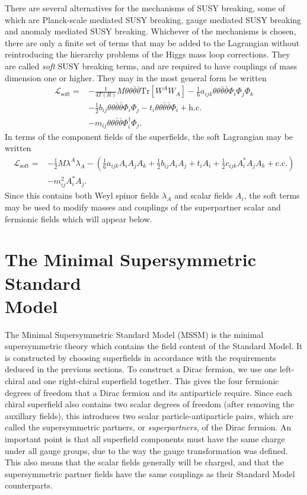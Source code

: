 \documentclass[twoside,english]{uiofysmaster}
\begin{document}
There are several alternatives for the mechanisms of SUSY breaking, some of which are Planck-scale mediated SUSY breaking, gauge mediated SUSY breaking and anomaly mediated SUSY breaking. Whichever of the mechanisms is chosen, there are only a finite set of terms that may be added to the Lagrangian without reintroducing the hierarchy problems of the Higgs mass loop corrections. They are called {\it soft} SUSY breaking terms, and are required to have couplings of mass dimension one or higher. They may in the most general form be written
\begin{align}
	\mathcal{L}_\mathrm{soft} = &-\frac{1}{4T(R)}M\theta\theta\bar\theta\bar\theta \mathrm{Tr} [W^A W_A] - \frac{1}{6}a_{ijk} \theta\theta\bar\theta\bar\theta\Phi_i \Phi_j \Phi_k\nonumber\\
	&-\frac{1}{2}b_{ij} \theta\theta\bar\theta\bar\theta\Phi_i \Phi_j - t_i \theta\theta\bar\theta\bar\theta \Phi_i + \mathrm{h.c.}\\
	&-m_{ij} \theta\theta\bar\theta\bar\theta \Phi_i^\dag \Phi_j.\nonumber
\end{align}
In terms of the component fields of the superfields, the soft Lagrangian may be written
\begin{align}
	\mathcal{L}_\mathrm{soft} = &-\frac{1}{2} M\lambda^A\lambda_A - \left( \frac{1}{6} a_{ijk} A_i A_j A_k + \frac{1}{2} b_{ij} A_i A_j + t_i A_i + \frac{1}{2} c_{ijk} A^*_i A_j A_k + \mathrm{c.c.}\right)\\
	&- m_{ij}^2 A_i^* A_j.\nonumber
\end{align}
Since this contains both Weyl spinor fields $\lambda_A$ and scalar fields $A_i$, the soft terms may be used to modify masses and couplings of the superpartner scalar and fermionic fields which will appear below.



\section[The Minimal Supersymmetric Standard Model]{The Minimal Supersymmetric Standard\\ Model}
The Minimal Supersymmetric Standard Model (MSSM) is the minimal supersymmetric theory which contains the field content of the Standard Model. It is constructed by choosing superfields in accordance with the requirements deduced in the previous sections. To construct a Dirac fermion, we use one left-chiral and one right-chiral superfield together. This gives the four fermionic degrees of freedom that a Dirac fermion and its antiparticle require. Since each chiral superfield also contains two scalar degrees of freedom (after removing the auxillary fields), this introduces two scalar particle-antiparticle pairs, which are called the supersymmetric partners, or {\it superpartners}, of the Dirac fermion. An important point is that all superfield components must have the same charge under all gauge groups, due to the way the gauge transformation was defined. This also means that the scalar fields generally will be charged, and that the supersymmetric partner fields have the same couplings as their Standard Model counterparts.
\end{document}
